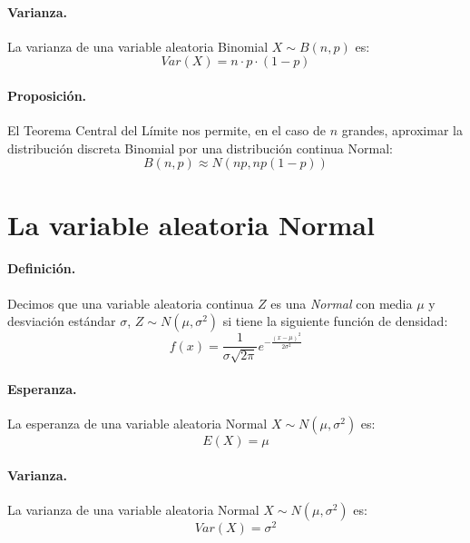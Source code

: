 \paragraph{Varianza.} La varianza de una variable aleatoria Binomial 
$X \sim B(n,p)$ es:
\begin{displaymath}
Var(X)= n \cdot p \cdot (1-p)
\end{displaymath}

\paragraph{Proposici\'on.} El Teorema Central del L\'imite nos permite, en el
caso de $n$ grandes, aproximar la distribuci\'on discreta Binomial por una 
distribuci\'on continua Normal:
\begin{displaymath}
B(n,p) \approx N\left(n p, n p (1-p)\right)
\end{displaymath}



\section{La variable aleatoria Normal}

\paragraph{Definici\'on.} Decimos que una variable aleatoria continua $Z$ es 
una \emph{Normal} con media $\mu$ y desviaci\'on est\'andar $\sigma$, 
$Z \sim N(\mu, \sigma^2)$ si tiene la siguiente funci\'on de densidad:
\begin{displaymath}
f(x) = \frac{1}{\sigma \sqrt{2 \pi}} e^{-\frac{(x-\mu)^2}{2 \sigma^2}}
\end{displaymath}

\paragraph{Esperanza.} La esperanza de una variable aleatoria Normal 
$X \sim N(\mu,\sigma^2)$ es:
\begin{displaymath}
E(X) = \mu
\end{displaymath}

\paragraph{Varianza.} La varianza de una variable aleatoria Normal 
$X \sim N(\mu,\sigma^2)$ es:
\begin{displaymath}
Var(X)= \sigma^2
\end{displaymath}

